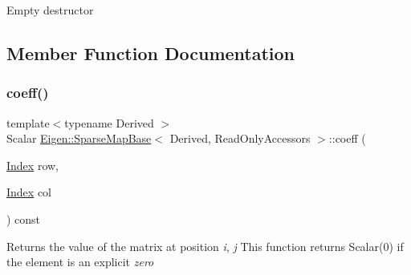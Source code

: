 Empty destructor 

\subsection{Member Function Documentation}
\mbox{\label{class_eigen_1_1_sparse_map_base_3_01_derived_00_01_read_only_accessors_01_4_a195e66f79171f78cc22d91fff37e36e3}} 
\subsubsection{\texorpdfstring{coeff()}{coeff()}}
{\footnotesize\ttfamily template$<$typename Derived $>$ \\
Scalar \mbox{\hyperlink{class_eigen_1_1_sparse_map_base}{Eigen\+::\+Sparse\+Map\+Base}}$<$ Derived, Read\+Only\+Accessors $>$\+::coeff (\begin{DoxyParamCaption}\item[{\mbox{\hyperlink{struct_eigen_1_1_eigen_base_a554f30542cc2316add4b1ea0a492ff02}{Index}}}]{row,  }\item[{\mbox{\hyperlink{struct_eigen_1_1_eigen_base_a554f30542cc2316add4b1ea0a492ff02}{Index}}}]{col }\end{DoxyParamCaption}) const\hspace{0.3cm}{\ttfamily [inline]}}





\begin{DoxyReturn}{Returns}
the value of the matrix at position {\itshape i}, {\itshape j} This function returns Scalar(0) if the element is an explicit {\itshape zero} 
\end{DoxyReturn}
\mbox{\label{class_eigen_1_1_sparse_map_base_3_01_derived_00_01_read_only_accessors_01_4_a0fc44f3781a869a3a410edd6691fd899}} 
